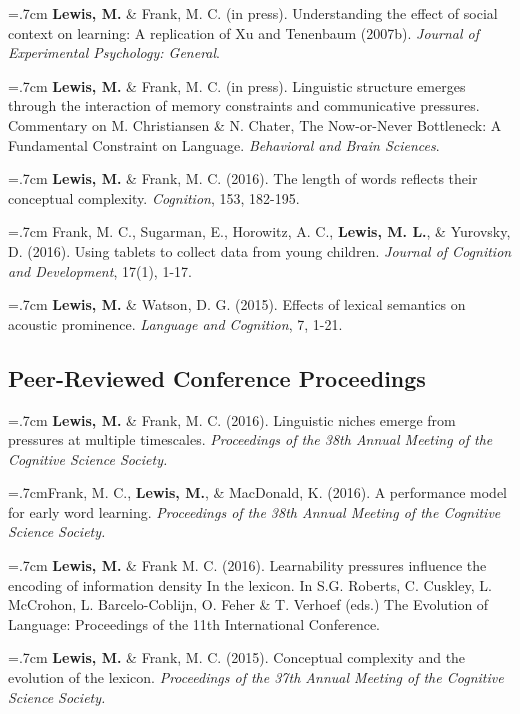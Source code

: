 \documentclass[letterpaper]{article}
\begin{document}
\onehalfspacing


  \hangindent=.7cm {\bf Lewis, M.} \& Frank, M. C. (in press). Understanding the effect of social context on learning: A replication of Xu and Tenenbaum (2007b). {\it Journal of Experimental Psychology: General}.

 \hangindent=.7cm {\bf Lewis, M.} \& Frank, M. C. (in press). Linguistic structure emerges through the interaction of memory constraints and communicative pressures. Commentary on M. Christiansen \& N. Chater, The Now-or-Never Bottleneck: A Fundamental Constraint on Language. {\it Behavioral and Brain Sciences}.
 
  \hangindent=.7cm {\bf Lewis, M.} \& Frank, M. C. (2016). The length of words reflects their conceptual complexity. {\it Cognition}, 153, 182-195.

 \hangindent=.7cm Frank, M. C., Sugarman, E., Horowitz, A. C., {\bf Lewis, M. L.}, \& Yurovsky, D. (2016). Using tablets to collect data from young children. {\it Journal of Cognition and Development}, 17(1), 1-17. 
 
  \hangindent=.7cm {\bf Lewis, M.} \& Watson, D. G. (2015). Effects of lexical semantics on acoustic prominence. { \it Language and Cognition}, 7, 1-21. 

  
  \subsection*{Peer-Reviewed Conference Proceedings} 
  \hangindent=.7cm {\bf Lewis, M.} \& Frank, M. C. (2016). Linguistic niches emerge from pressures at multiple timescales. { \it Proceedings of the 38th Annual Meeting of the Cognitive Science Society.}

   \hangindent=.7cmFrank, M. C.,  {\bf Lewis, M.}, \& MacDonald, K. (2016). A performance model for early word learning.  { \it Proceedings of the 38th Annual Meeting of the Cognitive Science Society.}

  \hangindent=.7cm {\bf Lewis, M.} \& Frank M. C. (2016). Learnability pressures influence the encoding of information density In the lexicon. In S.G. Roberts, C. Cuskley, L. McCrohon, L. Barcelo-Coblijn, O. Feher \& T. Verhoef (eds.) The Evolution of Language: Proceedings of the 11th International Conference.


 \hangindent=.7cm {\bf Lewis, M.} \& Frank, M. C. (2015). Conceptual complexity and the evolution of the lexicon. { \it Proceedings of the 37th Annual Meeting of the Cognitive Science Society.}
 
\end{document}
